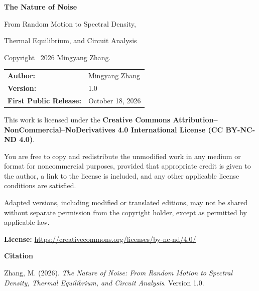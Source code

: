 \thispagestyle{empty}
\vspace*{16mm}

{\sffamily\bfseries\large The Nature of Noise}\par
\vspace{2mm}
{\sffamily From Random Motion to Spectral Density,\par
Thermal Equilibrium, and Circuit Analysis}\par
\vspace{8mm}

Copyright \textcopyright\ 2026 Mingyang Zhang.

\vspace{5mm}
\begin{tabular}{@{}ll@{}}
\textbf{Author:} & Mingyang Zhang\\[2pt]
\textbf{Version:} & 1.0\\[2pt]
\textbf{First Public Release:} & October 18, 2026
\end{tabular}

\vspace{7mm}
This work is licensed under the\newline
\textbf{Creative Commons Attribution--\allowbreak NonCommercial--\allowbreak NoDerivatives 4.0 International License (CC BY-NC-ND 4.0)}.

You are free to copy and redistribute the unmodified work in any medium or format for noncommercial purposes, provided that appropriate credit is given to the author, a link to the license is included, and any other applicable license conditions are satisfied.

Adapted versions, including modified or translated editions, may not be shared without separate permission from the copyright holder, except as permitted by applicable law.

\textbf{License:} \url{https://creativecommons.org/licenses/by-nc-nd/4.0/}

\vspace{6mm}
{\sffamily\bfseries Citation}\par
\vspace{2mm}
Zhang, M. (2026). \emph{The Nature of Noise: From Random Motion to Spectral Density, Thermal Equilibrium, and Circuit Analysis}. Version 1.0.

\clearpage
\setcounter{page}{1}

